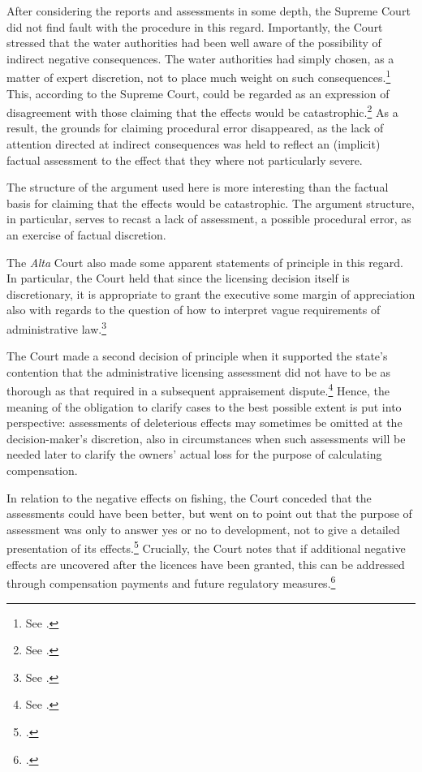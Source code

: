 After considering the reports and assessments in some depth, the Supreme Court did not find fault with the procedure in this regard. Importantly, the Court stressed that the water authorities had been well aware of the possibility of indirect negative consequences. The water authorities had simply chosen, as a matter of expert discretion, not to place much weight on such consequences.\footnote{See \cite[279]{alta82}.} This, according to the Supreme Court, could be regarded as an expression of disagreement with those claiming that the effects would be catastrophic.\footnote{See \cite[278]{alta82}.} As a result, the grounds for claiming procedural error disappeared, as the lack of attention directed at indirect consequences was held to reflect an (implicit) factual assessment to the effect that they where not particularly severe.

The structure of the argument used here is more interesting than the factual basis for claiming that the effects would be catastrophic. The argument structure, in particular, serves to recast a lack of assessment, a possible procedural error, as an exercise of factual discretion.

The {\it Alta} Court also made some apparent statements of principle in this regard. In particular, the Court held that since the licensing decision itself is discretionary, it is appropriate to grant the executive some margin of appreciation also with regards to the question of how to interpret vague requirements of administrative law.\footnote{See \cite[262-264]{alta82}.}


The Court made a second decision of principle when it supported the state's contention that the administrative licensing assessment did not have to be as thorough as that required in a subsequent appraisement dispute.\footnote{See \cite[279|330]{alta82}.} Hence, the meaning of the obligation to clarify cases to the best possible extent is put into perspective: assessments of deleterious effects may sometimes be omitted at the decision-maker's discretion, also in circumstances when such assessments will be needed later to clarify the owners' actual loss for the purpose of calculating compensation.

In relation to the negative effects on fishing, the Court conceded that the assessments could have been better, but went on to point out that the purpose of assessment was only to answer yes or no to development, not to give a detailed presentation of its effects.\footcite[330]{alta82} Crucially, the Court notes that if additional negative effects are uncovered after the licences have been granted, this can be addressed through compensation payments and future regulatory measures.\footcite[330]{alta82}

